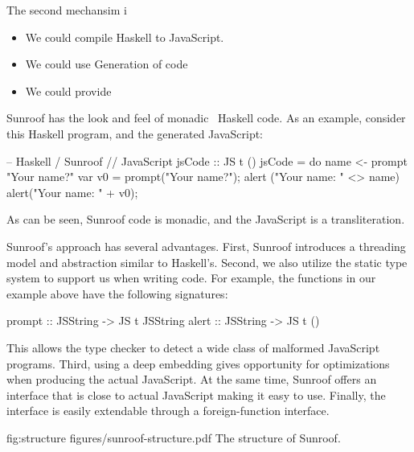 The second mechansim i

\begin{itemize}
\item We could compile Haskell to JavaScript.
\item We could use Generation of code
\item We could provide 

\end{itemize}

Sunroof has the look and feel of monadic~\cite{Moggi:91:ComputationMonads} Haskell code. As an example,
consider this Haskell program, and the generated JavaScript:

\noindent
\begin{Code}
-- Haskell / Sunroof                 // JavaScript
jsCode :: JS t ()
jsCode = do
   name <- prompt "Your name?"       var v0 = prompt("Your name?"); 
   alert ("Your name: " <> name)     alert("Your name: " + v0);
\end{Code}%
As can be seen, Sunroof code is monadic, and the JavaScript is a transliteration.

Sunroof's approach has several advantages. 
First,
Sunroof introduces a threading model and abstraction similar
to Haskell's. 
Second, we also utilize the static type system to support us when 
writing code. For example, the functions
in our example above have the following signatures:
\begin{Code}
prompt :: JSString -> JS t JSString
alert  :: JSString -> JS t ()
\end{Code}
This allows the type checker to detect a wide class
of malformed JavaScript programs.
Third, using a deep embedding gives opportunity 
for optimizations when producing the actual JavaScript.
At the same time, Sunroof offers an interface that is 
close to actual JavaScript making it easy to use.
Finally, the interface is easily extendable through
a foreign-function interface.

\Figure%
{fig:structure}%
{figures/sunroof-structure.pdf}%
{The structure of Sunroof.}

